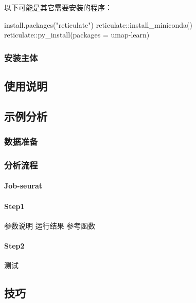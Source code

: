 \documentclass[
]{article}
\newenvironment{Shaded}{\begin{snugshade}}{\end{snugshade}}
\newcommand{\AttributeTok}[1]{\textcolor[rgb]{0.77,0.63,0.00}{#1}}
\newcommand{\FunctionTok}[1]{\textcolor[rgb]{0.00,0.00,0.00}{#1}}
\newcommand{\NormalTok}[1]{#1}
\newcommand{\SpecialCharTok}[1]{\textcolor[rgb]{0.00,0.00,0.00}{#1}}
\newcommand{\StringTok}[1]{\textcolor[rgb]{0.31,0.60,0.02}{#1}}
\begin{document}
以下可能是其它需要安装的程序：

\begin{Shaded}
\begin{Highlighting}[]
\FunctionTok{install.packages}\NormalTok{(}\StringTok{"reticulate"}\NormalTok{)}
\NormalTok{reticulate}\SpecialCharTok{::}\FunctionTok{install\_miniconda}\NormalTok{()}
\NormalTok{reticulate}\SpecialCharTok{::}\FunctionTok{py\_install}\NormalTok{(}\AttributeTok{packages =} \StringTok{\textquotesingle{}umap{-}learn\textquotesingle{}}\NormalTok{)}
\end{Highlighting}
\end{Shaded}

\hypertarget{ux5b89ux88c5ux4e3bux4f53}{%
\subsubsection{安装主体}\label{ux5b89ux88c5ux4e3bux4f53}}

\hypertarget{ux4f7fux7528ux8bf4ux660e}{%
\subsection{使用说明}\label{ux4f7fux7528ux8bf4ux660e}}

\hypertarget{ux793aux4f8bux5206ux6790}{%
\subsection{示例分析}\label{ux793aux4f8bux5206ux6790}}

\hypertarget{ux6570ux636eux51c6ux5907}{%
\subsubsection{数据准备}\label{ux6570ux636eux51c6ux5907}}

\hypertarget{ux5206ux6790ux6d41ux7a0b}{%
\subsubsection{分析流程}\label{ux5206ux6790ux6d41ux7a0b}}

\hypertarget{job-seurat}{%
\paragraph{Job-seurat}\label{job-seurat}}

\hypertarget{step1}{%
\paragraph{Step1}\label{step1}}

参数说明
运行结果
参考函数

\hypertarget{step2}{%
\paragraph{Step2}\label{step2}}

测试

\hypertarget{ux6280ux5de7}{%
\subsection{技巧}\label{ux6280ux5de7}}
\end{document}
